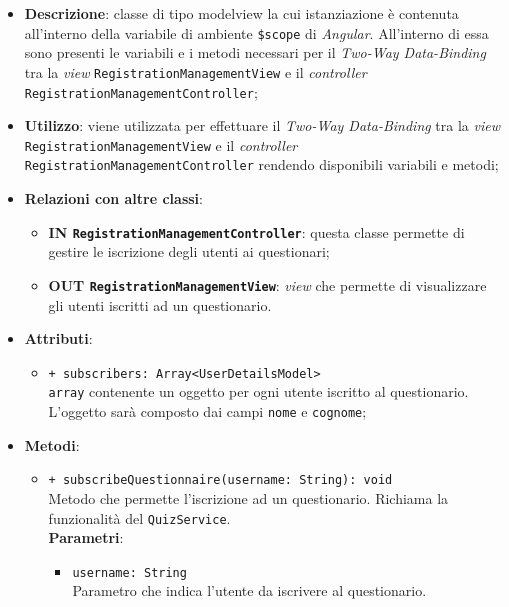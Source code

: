 	\begin{itemize}
		\item \textbf{Descrizione}: classe di tipo modelview la cui istanziazione è contenuta all'interno della variabile di ambiente \texttt{\$scope} di \textit{Angular}. All'interno di essa sono presenti le variabili e i metodi necessari per il \textit{Two-Way Data-Binding} tra la \textit{view} \texttt{RegistrationManagementView} e il \textit{controller} \texttt{RegistrationManagementController};
		\item \textbf{Utilizzo}: viene utilizzata per effettuare il \textit{Two-Way Data-Binding} tra la \textit{view}\\ \texttt{RegistrationManagementView} e il \textit{controller} \texttt{RegistrationManagementController} rendendo disponibili variabili e metodi;
		\item \textbf{Relazioni con altre classi}: 
		\begin{itemize}
			\item \textbf{IN \texttt{RegistrationManagementController}}: questa classe permette di gestire le iscrizione degli utenti ai questionari;
			\item \textbf{OUT \texttt{RegistrationManagementView}}: \textit{view} che permette di visualizzare gli utenti iscritti ad un questionario.
		\end{itemize}
		\item \textbf{Attributi}: 
		\begin{itemize}
			\item \texttt{+ subscribers: Array<UserDetailsModel>} \\ \texttt{array} contenente un oggetto per ogni utente iscritto al questionario. L'oggetto sarà composto dai campi \texttt{nome} e \texttt{cognome};
		\end{itemize}
		\item \textbf{Metodi}: 
		\begin{itemize}
			\item \texttt{+ subscribeQuestionnaire(username: String): void} \\ Metodo che permette l'iscrizione ad un questionario. Richiama la funzionalità del \texttt{QuizService}. \\
			\textbf{Parametri}:
			\begin{itemize}
				\item \texttt{username: String}\\
				Parametro che indica l'utente da iscrivere al questionario.
			\end{itemize}
		\end{itemize}
	\end{itemize}
	
	
